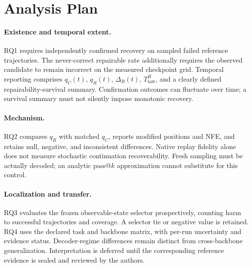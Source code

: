 \section{Analysis Plan}

\paragraph{Existence and temporal extent.}
RQ1 requires independently confirmed recovery on sampled failed reference
trajectories. The never-correct repairable rate additionally requires the
observed candidate to remain incorrect on the measured checkpoint grid.
Temporal reporting comprises $q_C(t)$, $q_R(t)$, $\Delta_R(t)$,
$T_{\mathrm{last}}^R$, and a clearly defined repairability-survival summary.
Confirmation outcomes can fluctuate over time; a survival summary must not
silently impose monotonic recovery.

\paragraph{Mechanism.}
RQ2 compares $q_R$ with matched $q_C$, reports modified positions and NFE, and
retains null, negative, and inconsistent differences. Native replay fidelity
alone does not measure stochastic continuation recoverability. Fresh sampling
must be actually decoded; an analytic pass@$k$ approximation cannot substitute
for this control.

\paragraph{Localization and transfer.}
RQ3 evaluates the frozen observable-state selector prospectively, counting harm
to successful trajectories and coverage. A selector tie or negative value is
retained. RQ4 uses the declared task and backbone matrix, with per-run
uncertainty and evidence status. Decoder-regime differences remain distinct
from cross-backbone generalization. Interpretation is deferred until the
corresponding reference evidence is sealed and reviewed by the authors.
